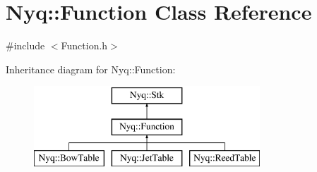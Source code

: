 \hypertarget{class_nyq_1_1_function}{}\section{Nyq\+:\+:Function Class Reference}
\label{class_nyq_1_1_function}


{\ttfamily \#include $<$Function.\+h$>$}

Inheritance diagram for Nyq\+:\+:Function\+:\begin{figure}[H]
\begin{center}
\leavevmode
\includegraphics[height=3.000000cm]{class_nyq_1_1_function}
\end{center}
\end{figure}
